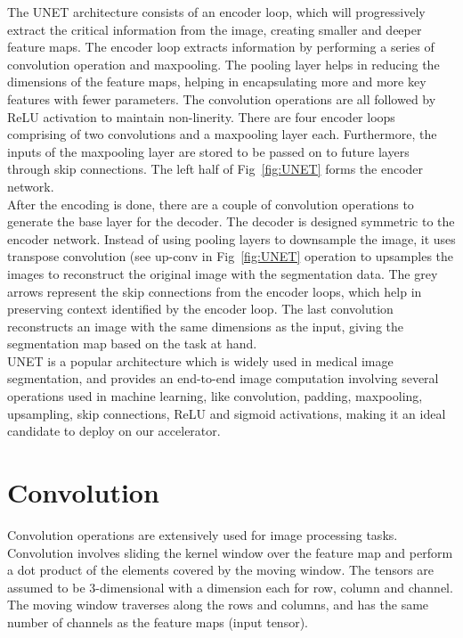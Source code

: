 \documentclass[a4paper,12pt, final]{report}
\begin{document}
The UNET architecture consists of an encoder loop, which will progressively extract the critical information from the image, creating smaller and deeper feature maps. The encoder loop extracts information by performing a series of convolution operation and maxpooling. The pooling layer helps in reducing the dimensions of the feature maps, helping in encapsulating more and more key features with fewer parameters. The convolution operations are all followed by ReLU activation to maintain non-linerity. There are four encoder loops comprising of two convolutions and a maxpooling layer each. Furthermore, the inputs of the maxpooling layer are stored to be passed on to future layers through skip connections. The left half of Fig~\ref{fig:UNET} forms the encoder network.
\\

After the encoding is done, there are a couple of convolution operations to generate the base layer for the decoder. The decoder is designed symmetric to the encoder network. Instead of using pooling layers to downsample the image, it uses transpose convolution (see up-conv in  Fig~\ref{fig:UNET} operation to upsamples the images to reconstruct the original image with the segmentation data. The grey arrows represent the skip connections from the encoder loops, which help in preserving context identified by the encoder loop. The last convolution reconstructs an image with the same dimensions as the input, giving the segmentation map based on the task at hand.
\\

UNET is a popular architecture which is widely used in medical image segmentation, and provides an end-to-end image computation involving several operations used in machine learning, like convolution, padding, maxpooling, upsampling, skip connections, ReLU and sigmoid activations, making it an ideal candidate to deploy on our accelerator.
\\


\section{Convolution}

Convolution operations are extensively used for image processing tasks. Convolution involves sliding the kernel window over the feature map and perform a dot product of the elements covered by the moving window. The tensors are assumed to be 3-dimensional with a dimension each for row, column and channel. The moving window traverses along the rows and columns, and has the same number of channels as the feature maps (input tensor).
\\
\end{document}
